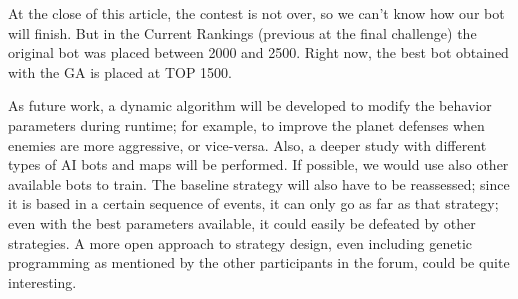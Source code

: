 \documentclass{llncs}
\begin{document}
At the close of this article, the contest is not over, so we can't
know how our bot will finish. But in the Current Rankings (previous at
the final challenge) the original bot was placed between 2000 and
2500. Right now, the best bot obtained with the GA is placed at TOP
1500. %

As future work, a dynamic algorithm will be developed to modify the
behavior parameters during runtime; for example, to improve the
planet defenses when enemies are more aggressive, or vice-versa. Also,
a deeper study with different types of AI bots and maps will be
performed. If possible, we would use also other available bots to
train. The baseline strategy will also have to be reassessed; since it
is based in a certain sequence of events, it can only go as far as
that strategy; even with the best parameters available, it could
easily be defeated by other strategies. A more open approach to
strategy design, even including genetic programming as mentioned by
the other participants in the forum, could be quite interesting. 








\end{document}
